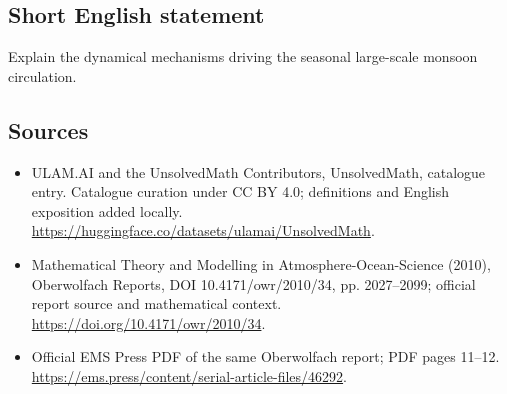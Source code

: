 \documentclass[11pt]{article}
\begin{document}
\subsection{Short English statement}
Explain the dynamical mechanisms driving the seasonal large-scale monsoon circulation.
\subsection{Sources}
\begin{itemize}
\item[\hypertarget{source:statement:1}{S1}] ULAM.AI and the UnsolvedMath Contributors, UnsolvedMath, catalogue entry. Catalogue curation under CC BY 4.0; definitions and English exposition added locally.
\url{https://huggingface.co/datasets/ulamai/UnsolvedMath}.
\item[\hypertarget{source:statement:2}{S2}] Mathematical Theory and Modelling in Atmosphere-Ocean-Science (2010), Oberwolfach Reports, DOI 10.4171/owr/2010/34, pp. 2027--2099; official report source and mathematical context.
\url{https://doi.org/10.4171/owr/2010/34}.
\item[\hypertarget{source:statement:3}{S3}] Official EMS Press PDF of the same Oberwolfach report; PDF pages 11--12.
\url{https://ems.press/content/serial-article-files/46292}.
\end{itemize}
\label{end:statement}
\end{document}
